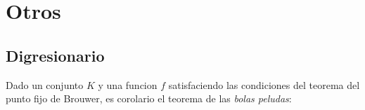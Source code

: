 \documentclass{book}
\begin{document}
\chapter{Otros}
\section{Digresionario}
\begin{teorema}
    Dado un conjunto $K$ y una funcion $f$ satisfaciendo las condiciones del teorema del punto fijo de Brouwer,
    es corolario el teorema de las \textit{bolas peludas}:
\end{teorema}
\end{document}

